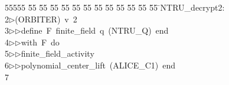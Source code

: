 %
%
\begin{tabbing}
55555 \= 55 \= 55 \= 55 \= 55 \= 55 \= 55 \= 55 \= 55 \= 55 \= 55 \= 55 \= 55 \= \>NTRU\_decrypt2:\\[0pt]
2\>$\triangleright$\>(ORBITER)\ v\ 2\ \\[0pt]
3\>$\triangleright$\>$\triangleright$\>define\ F\ finite\_field\ q\ (NTRU\_Q)\ end\ \\[0pt]
4\>$\triangleright$\>$\triangleright$\>with\ F\ do\ \\[0pt]
5\>$\triangleright$\>$\triangleright$\>finite\_field\_activity\ \\[0pt]
6\>$\triangleright$\>$\triangleright$\>polynomial\_center\_lift\ (ALICE\_C1)\ end\\[0pt]
7\>\end{tabbing}
